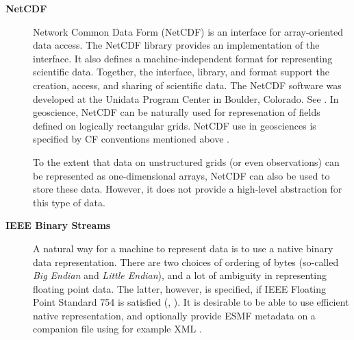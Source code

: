 \begin{description}
\item[\bf NetCDF] Network Common Data Form (NetCDF) is an interface for 
array-oriented data access. The NetCDF library provides an
implementation of the interface. It also defines a 
machine-independent format for representing scientific data. Together,
the interface, library, and format support the creation, access, and
sharing of scientific data. The NetCDF software was developed at the
Unidata Program Center in Boulder, Colorado. See \cite{NetCDF3_UsersGuide_C}.
In geoscience, NetCDF can be naturally used for represenation of fields 
defined on logically rectangular grids. NetCDF use in geosciences is 
specified by CF conventions mentioned above \cite{NetCDF_CF_v1_beta3}. 

To the extent that data on unstructured grids (or even observations) can be 
represented as one-dimensional arrays, NetCDF can also be used to store these 
data. However, it does not provide a high-level abstraction for this type of 
data. 

\item[\bf IEEE Binary Streams]
A natural way for a machine to represent data is to use a native
binary data representation. There are two choices of ordering of bytes
(so-called {\it Big Endian} and {\it Little Endian}), and a lot of
ambiguity in representing floating point data. The latter, however, is
specified, if IEEE Floating Point Standard 754 is satisfied
(\cite{IEEE-Floating-Point}, \cite{Kahan-IEEE-754}). It is desirable
to be able to use efficient native representation, and optionally
provide ESMF metadata on a companion file using for example XML
\cite{XML-W3C}.

\end{description}





